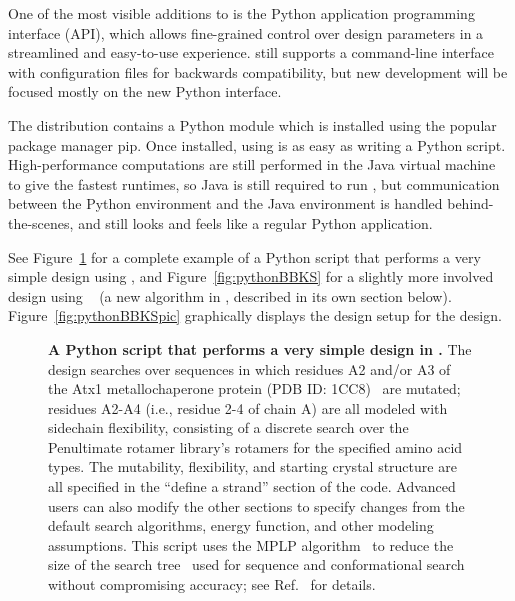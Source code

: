 
One of the most visible additions to  is the Python application programming interface (API), which allows fine-grained control over design parameters in a streamlined and easy-to-use experience.  still supports a command-line interface with configuration files for backwards compatibility, but new development will be focused mostly on the new Python interface. %

The  distribution contains a Python module which is installed using the popular package manager {\sc pip}. Once installed, using  is as easy as writing a Python script. High-performance computations are still performed in the Java virtual machine to give the fastest runtimes, so Java is still required to run , but communication between the Python environment and the Java environment is handled behind-the-scenes, and  still looks and feels like a regular Python application.

See Figure~\ref{fig:pythonGMEC} for a complete example of a Python script that performs a very simple design using , and Figure~\ref{fig:pythonBBKS} for a slightly more involved design using \bbks~\cite{BBK*} (a new algorithm in , described in its own section below).  Figure~\ref{fig:pythonBBKSpic} graphically displays the design setup for the \bbks design.  

\begin{figure}
\vspace{-0.7in}
{
	
}
\caption{\textbf{A Python script that performs a very simple design in .}  The design searches over sequences in which residues A2 and/or A3 of the Atx1 metallochaperone protein (PDB ID: 1CC8)~\cite{1CC8} are mutated; residues A2-A4 (i.e., residue 2-4 of chain A) are all modeled with sidechain flexibility, consisting of a discrete search over the Penultimate rotamer library\cite{penultimate}'s rotamers for the specified amino acid types.  The mutability, flexibility, and starting crystal structure are all specified in the ``define a strand'' section of the code.  Advanced users can also modify the other sections to specify changes from the default search algorithms, energy function, and other modeling assumptions.  This script uses the MPLP algorithm~\cite{MPLP} to reduce the size of the \as search tree~\cite{DEE/A*} used for sequence and conformational search without compromising accuracy; see Ref.~\cite{dynamic_A*} for details.  }
\label{fig:pythonGMEC}
\end{figure}


